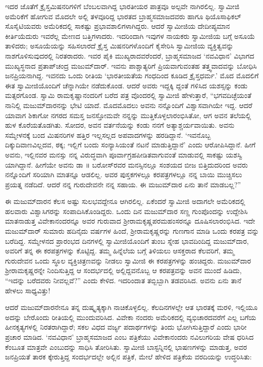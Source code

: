 ಇದರ ಜೊತೆಗೆ ಕ್ರೈಸ್ತಮಿಷನರಿಗಳಿಗೆ ಬೆಂಬಲವಾಗಿದ್ದ ಭಾರತೀಯರ ಪಾತ್ರವೂ ಅಲ್ಪವೇ ನಾಗಿರಲಿಲ್ಲ. ಸ್ವಾಮೀಜಿ ಅಮೆರಿಕೆಗೆ ಹೋಗುವ ಮೊದಲೇ ಅಲ್ಲಿ ತಳವೂರಿದ್ದ ಭಾರತದ ಬ್ರಾಹ್ಮಸಮಾಜದವರು ಹಾಗೂ ಥಿಯೊಸಾಫಿಕಲ್ ಸೊಸೈಟಿಯವರು ಅಮೆರಿಕದಲ್ಲಿ ಸಾಕಷ್ಟು ಪ್ರಭಾವಶಾಲಿಗಳಾಗಿದ್ದರು. ಆದರೆ ಸ್ವಾಮೀಜಿಯ ದೇದೀಪ್ಯಮಾನ ಕೀರ್ತಿಯೆದುರು ಇವರೆಲ್ಲ ಮೇಣದ ಬತ್ತಿಗಳಾದರು. ಇದರಿಂದಾಗಿ ಇವುಗಳ ನಾಯಕರು ಸ್ವಾಮೀಜಿಯ ಬಗ್ಗೆ ಅಸೂಯೆ ತಾಳಿದರು; ಅಸೂಯೆಯನ್ನು ಸಹಿಸಲಾರದೆ ಕ್ರೈಸ್ತ ಮಿಷನರಿಗಳೊಂದಿಗೆ ಕೈಸೇರಿಸಿ ಸ್ವಾಮೀಜಿಯ ವ್ಯಕ್ತಿತ್ವವನ್ನು ನಾಶಗೊಳಿಸುವುದರಲ್ಲಿ ನಿರತರಾದರು. ಇವರ ಪೈಕಿ ಮುಖ್ಯರಾದವರೆಂದರೆ, ಬ್ರಾಹ್ಮಸಮಾಜದ ‘ನವವಿಧಾನ’ ವಿಭಾಗದ ಮುಖ್ಯಸ್ಥನಾದ ಪ್ರತಾಪ್​ಚಂದ್ರ ಮಜುಮ್​ದಾರ್. ಇವನು ಪಾಶ್ಚಾತ್ಯರಿಗೆ ಪ್ರಿಯವಾಗುವಂತಹ ತತ್ತ್ವವಾದವನ್ನು ಬೋಧಿಸಿ ಜನಪ್ರಿಯನಾಗಿದ್ದ. ಇವನದು ಒಂದು ರೀತಿಯ ‘ಭಾರತೀಯತೆಯ ಗಂಧದಿಂದ ಕೂಡಿದ ಕ್ರೈಸ್ತಧರ್ಮ.’ ಮೊದ ಮೊದಲಿಗೆ ಈತ ಸ್ವಾಮೀಜಿಯೊಂದಿಗೆ ಚೆನ್ನಾಗಿಯೇ ನಡೆದುಕೊಂಡ. ಆದರೆ ಅವರು ಇದ್ದಕ್ಕಿ ದ್ದಂತೆ ಗಳಿಸಿದ ಯಶಸ್ಸನ್ನು ಕಂಡು ಮತ್ಸರಗೊಂಡ. ಸ್ವಾಮಿ ರಾಮಕೃಷ್ಣಾನಂದರಿಗೆ ಬರೆದ ಪತ್ರ ವೊಂದರಲ್ಲಿ ಸ್ವಾಮೀಜಿ ಹೇಳುತ್ತಾರೆ, “ಭಗವದಿಚ್ಛೆಯಂತೆ ನಾನಿಲ್ಲಿ ಮಜುಮ್​ದಾರನನ್ನು ಭೇಟಿ ಯಾದೆ. ಮೊದಮೊದಲು ಅವನು ನನ್ನೊಂದಿಗೆ ವಿಶ್ವಾಸವಾಗಿಯೇ ಇದ್ದ. ಆದರೆ ಯಾವಾಗ ಶಿಕಾಗೋ ನಗರದ ಸಮಸ್ತ ಜನಸ್ತೋಮವೇ ನನ್ನನ್ನು ಮುತ್ತಿಕೊಳ್ಳಲಾರಂಭಿಸಿತೋ, ಆಗ ಅವನ ತಲೆಯಲ್ಲಿ ಹುಳ ಕೊರೆಯತೊಡಗಿತು. ಸೋದರ, ಅವನ ವರ್ತನೆಯನ್ನು ಕಂಡು ನನಗೆ ಅತ್ಯಾಶ್ಚರ್ಯವಾಯಿತು. ಅವನು ಸಮ್ಮೇಳನಕ್ಕೆ ಬಂದ ಮಿಷನರಿಗಳ ಹತ್ತಿರ ಇಲ್ಲಸಲ್ಲದ ಅಪವಾದಗಳನ್ನು ಹರಡಿದ್ದಾನೆ. ‘ಇವನೊಬ್ಬ ದಿಕ್ಕುದಿವಾಣವಿಲ್ಲದವ, ಠಕ್ಕ; ಇಲ್ಲಿಗೆ ಬಂದು ಸಂನ್ಯಾಸಿಯಂತೆ ನಟನೆ ಮಾಡುತ್ತಿದ್ದಾನೆ’ ಎಂದು ಆರೋಪಿಸಿದ್ದಾನೆ. ಹೀಗೆ ಅವನು, ಇಲ್ಲಿನವರ ಮನಸ್ಸು ನನ್ನ ವಿರುದ್ಧವಾಗಿ ಪೂರ್ವಾಗ್ರಹಪೀಡಿತವಾಗುವಂತೆ ಮಾಡುವಲ್ಲಿ ಸಾಕಷ್ಟು ಯಶಸ್ವಿ ಯಾಗಿದ್ದಾನೆ. ಹೀಗೆಯೇ ಅವನು ಡಾ ॥ ಬರೋಸ್​ರವರ ಮನಸ್ಸಿನಲ್ಲೂ ಸಂಶಯದ ಬೀಜ ಬಿತ್ತಿದುದರಿಂದ ಅವರು ನನ್ನೊಂದಿಗೆ ಸರಿಯಾಗಿ ಮಾತನ್ನೂ ಆಡಲಿಲ್ಲ. ಅವರ ಪುಸ್ತಕಗಳಲ್ಲೂ ಕರಪತ್ರಗಳಲ್ಲೂ ನನ್ನ ಬಾಯಿ ಮುಚ್ಚಿಸಲು ಪ್ರಯತ್ನ ನಡೆದಿದೆ. ಆದರೆ ನನ್ನ ಗುರುದೇವನೇ ನನ್ನ ಸಹಾಯ. ಈ ಮಜುಮ್​ದಾರ ಏನು ತಾನೆ ಮಾಡಬಲ್ಲ?”

ಈ ಮಜುಮ್​ದಾರನ ಕೆಲಸ ಅಷ್ಟು ಸುಲಭವದ್ದೇನೂ ಆಗಿರಲಿಲ್ಲ. ಏಕೆಂದರೆ ಸ್ವಾಮೀಜಿ ಅದಾಗಲೇ ಅಮೆರಿಕದಲ್ಲಿ ಹಲವಾರು ವಿಶ್ವಾಸಿಗರನ್ನು ಸಂಪಾದಿಸಿಕೊಂಡಿದ್ದರು. ಒಂದು ದಿನ ಮಜುಮ್​ದಾರ ಸಣ್ಣ ಗುಂಪೊಂದನ್ನು ಉದ್ದೇಶಿಸಿ ಮಾತನಾಡುತ್ತ ವಿವೇಕಾನಂದರನ್ನೂ ಅವರ ಗುರುವಾದ ಶ್ರೀರಾಮಕೃಷ್ಣಪರಮಹಂಸರನ್ನೂ ದೂಷಿಸಲಾರಂಭಿಸಿದ. ಇದೇ ಮಜುಮ್​ದಾರ್ ಸುಮಾರು ಹದಿನೈದು ವರ್ಷಗಳ ಹಿಂದೆ, ಶ್ರೀರಾಮಕೃಷ್ಣರನ್ನು ಗುಣಗಾನ ಮಾಡಿ ಒಂದು ಕರಪತ್ರ ವನ್ನು ಬರೆದಿದ್ದ. ಸಮ್ಮೇಳನದ ಪ್ರಾರಂಭದ ದಿನಗಳಲ್ಲಿ ಸ್ವಾಮೀಜಿಯೊಂದಿಗೆ ತುಂಬ ಸ್ನೇಹ ಭಾವದಿಂದಿದ್ದ ಮಜುಮ್​ದಾರ, ಅವರಿಗೆ ತನ್ನ ಈ ಕರಪತ್ರಗಳನ್ನು ಕೊಟ್ಟಿದ್ದ. ತಮ್ಮ ಹಿನ್ನೆಲೆಯ ಬಗ್ಗೆ ತಿಳಿಯಲು ಆಸಕ್ತರಾದ ಕೆಲವರಿಗೆ, ತಮ್ಮ ಗುರುದೇವನ ಒಂದು ಸ್ಥೂಲ ವ್ಯಕ್ತಿಚಿತ್ರಣವನ್ನು ನೀಡಲು ಸ್ವಾಮೀಜಿ ಈ ಕರಪತ್ರಗಳನ್ನು ಹಂಚಿದ್ದರು. ಮಜುಮ್​ದಾರ ಶ್ರೀರಾಮಕೃಷ್ಣರನ್ನೇ ನಿಂದಿಸುತ್ತಿದ್ದ ಆ ಸಂದರ್ಭದಲ್ಲಿ ಅಲ್ಲಿದ್ದವನೊಬ್ಬ ಆ ಕರಪತ್ರವನ್ನು ಅವನ ಮುಂದೆ ಹಿಡಿದು, “ಇದನ್ನು ಬರೆದವರು ನೀವಲ್ಲವೆ?” ಎಂದು ಕೇಳಿದ. ಇದರಿಂದಾತ ತಬ್ಬಿಬ್ಬಾಗಿ ತಡವರಿಸಿದ. ಅವನು ಏನು ತಾನೆ ಹೇಳಲು ಸಾಧ್ಯವಿತ್ತು!

ಆದರೆ ಮಜುಮ್​ದಾರನೇನೂ ತನ್ನ ದುಷ್ಕೃತ್ಯಕ್ಕಾಗಿ ನಾಚಿಕೊಳ್ಳಲಿಲ್ಲ. ಕೆಲದಿನಗಳಲ್ಲೇ ಆತ ಭಾರತಕ್ಕೆ ಮರಳಿ, ಇಲ್ಲಿಯೂ ಅದನ್ನು ಬೇರೊಂದು ರೀತಿಯಲ್ಲಿ ಮುಂದುವರಿಸಿದ. ವಿವೇಕಾ ನಂದರು ಅಮೆರಿಕದಲ್ಲಿ ವ್ಯಭಿಚಾರದವರೆಗೆ ಎಲ್ಲ ಬಗೆಯ ಹೀನಕೃತ್ಯಗಳಲ್ಲಿ ನಿರತರಾಗಿದ್ದಾರೆ; ಸಕಲ ವಿಧದ ವರ್ಜ್ಯ ಪದಾರ್ಥಗಳನ್ನು ತಿಂದು ಭೋಗಿಸುತ್ತಿದ್ದಾರೆ ಎಂದು ಭಾರೀ ಪ್ರಚಾರ ಮಾಡಿದ. ‘ನವವಿಧಾನ’ ಬ್ರಾಹ್ಮಸಮಾಜದ  ಎಂಬ ಪತ್ರಿಕೆಯು ವಿವೇಕಾನಂದರು ನವಿಲುಗರಿಯ ವೇಷ ಧರಿಸಿದ ಕೆಂಬೂತ ಮಾತ್ರವೇ ಎಂಬುದನ್ನು ಸಾಧಿಸಿ ತೋರಿಸಿತು. ಸ್ವಾಮೀಜಿ ಬಾಸ್ಟನ್ನಿನಲ್ಲಿ ಭಾಷಣಗಳನ್ನು ಮಾಡುತ್ತ, ಅವರ ಜನಪ್ರಿಯತೆ ತಾರಕ ಕ್ಕೇರುತ್ತಿದ್ದ ಸಂದರ್ಭದಲ್ಲೇ ಅಲ್ಲಿನ  ಪತ್ರಿಕೆ, ಮೇಲೆ ಹೇಳಿದ ಪತ್ರಿಕೆಯ ವರದಿಯನ್ನು ಉದ್ಧರಿಸಿತು:

